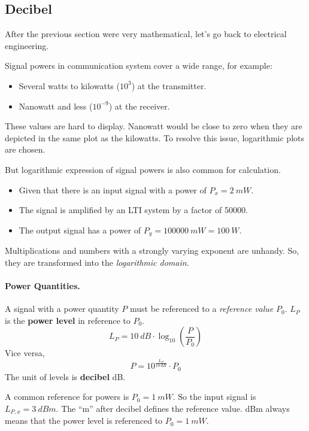 \begin{refsection}
\subsection{Decibel}

After the previous section were very mathematical, let's go back to electrical engineering.

Signal powers in communication system cover a wide range, for example:
\begin{itemize}
	\item Several watts to kilowatts ($10^3$) at the transmitter.
	\item Nanowatt and less ($10^{-9}$) at the receiver.
\end{itemize}
These values are hard to display. Nanowatt would be close to zero when they are depicted in the same plot as the kilowatts. To resolve this issue, logarithmic plots are chosen.


But logarithmic expression of signal powers is also common for calculation.
\begin{itemize}
	\item Given that there is an input signal with a power of $P_x = \SI{2}{mW}$.
	\item The signal is amplified by an \ac{LTI} system by a factor of \num{50000}.
	\item The output signal has a power of $P_y = \SI{100000}{mW} = \SI{100}{W}$.
\end{itemize}

Multiplications and numbers with a strongly varying exponent are unhandy. So, they are transformed into the \emph{logarithmic domain}.

\paragraph{Power Quantities.}
A signal with a power quantity $P$ must be referenced to a \emph{reference value} $P_0$. $L_P$ is the  \textbf{power level} in reference to $P_0$.
\begin{equation}
	L_P = \SI{10}{dB} \cdot \log_{10} \left(\frac{P}{P_0}\right)
	\label{eq:ch03:level_dbm}
\end{equation}
Vice versa,
\begin{equation}
	P = 10^{\frac{L_P}{\SI{10}{dB}}} \cdot P_0
\end{equation}
The unit of levels is  \textbf{decibel} \si{dB}.

A common reference for powers is $P_0 = \SI{1}{mW}$. So the input signal is $L_{P,x} = \SI{3}{dBm}$. The ``m'' after decibel defines the reference value. \si{dBm} always means that the power level is referenced to $P_0 = \SI{1}{mW}$.


\end{refsection}

